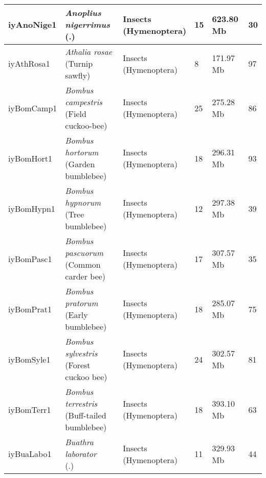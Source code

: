 \begin{centering}
\begin{longtable}{l|l|l|l|l|l}
iyAnoNige1 & \makecell[{l}]{\textit{Anoplius nigerrimus} \\ (.)} & \makecell[{l}]{Insects \\ (Hymenoptera)} & 15 & 623.80 Mb & 30  \\ \hline
iyAthRosa1 & \makecell[{l}]{\textit{Athalia rosae} \\ (Turnip sawfly)} & \makecell[{l}]{Insects \\ (Hymenoptera)} & 8 & 171.97 Mb & 97  \\ \hline
iyBomCamp1 & \makecell[{l}]{\textit{Bombus campestris} \\ (Field cuckoo-bee)} & \makecell[{l}]{Insects \\ (Hymenoptera)} & 25 & 275.28 Mb & 86  \\ \hline
iyBomHort1 & \makecell[{l}]{\textit{Bombus hortorum} \\ (Garden bumblebee)} & \makecell[{l}]{Insects \\ (Hymenoptera)} & 18 & 296.31 Mb & 93  \\ \hline
iyBomHypn1 & \makecell[{l}]{\textit{Bombus hypnorum} \\ (Tree bumblebee)} & \makecell[{l}]{Insects \\ (Hymenoptera)} & 12 & 297.38 Mb & 39  \\ \hline
iyBomPasc1 & \makecell[{l}]{\textit{Bombus pascuorum} \\ (Common carder bee)} & \makecell[{l}]{Insects \\ (Hymenoptera)} & 17 & 307.57 Mb & 35  \\ \hline
iyBomPrat1 & \makecell[{l}]{\textit{Bombus pratorum} \\ (Early bumblebee)} & \makecell[{l}]{Insects \\ (Hymenoptera)} & 18 & 285.07 Mb & 75  \\ \hline
iyBomSyle1 & \makecell[{l}]{\textit{Bombus sylvestris} \\ (Forest cuckoo bee)} & \makecell[{l}]{Insects \\ (Hymenoptera)} & 24 & 302.57 Mb & 81  \\ \hline
iyBomTerr1 & \makecell[{l}]{\textit{Bombus terrestris} \\ (Buff-tailed bumblebee)} & \makecell[{l}]{Insects \\ (Hymenoptera)} & 18 & 393.10 Mb & 63  \\ \hline
iyBuaLabo1 & \makecell[{l}]{\textit{Buathra laborator} \\ (.)} & \makecell[{l}]{Insects \\ (Hymenoptera)} & 11 & 329.93 Mb & 44  \\ \hline

\end{longtable}
\end{centering}
